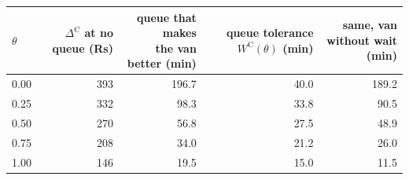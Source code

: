 \begin{tabular}{lrrrr}\toprule
$\theta$ & \shortstack{$\Delta^{\mathrm{C}}$ at no queue\\(Rs)} & \shortstack{queue that makes\\the van better (min)} & \shortstack{queue tolerance\\$W^{\mathrm{C}}(\theta)$ (min)} & \shortstack{same, van\\without wait (min)} \\ \midrule
0.00 & 393 & 196.7 & 40.0 & 189.2 \\
0.25 & 332 & 98.3 & 33.8 & 90.5 \\
0.50 & 270 & 56.8 & 27.5 & 48.9 \\
0.75 & 208 & 34.0 & 21.2 & 26.0 \\
1.00 & 146 & 19.5 & 15.0 & 11.5 \\
\bottomrule\end{tabular}
